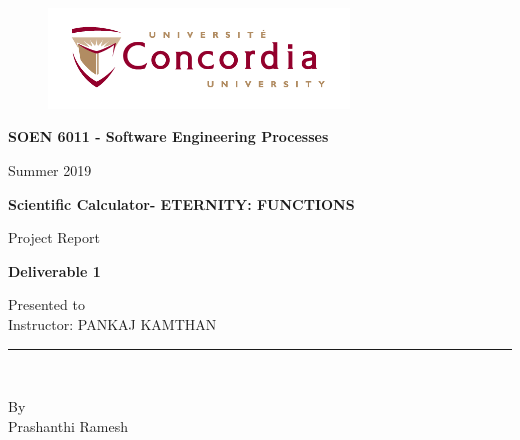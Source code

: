 \documentclass[11pt, english]{report}
\begin{document}
\begin{titlepage}

\begin{center}
\vspace*{-1in}
\begin{figure}[htb]
\begin{center}
\includegraphics[width=8cm]{logo}
\end{center}
\end{figure}
\begin{Large}
\textbf{SOEN 6011 - Software Engineering Processes} \\
\end{Large}
\vspace*{0.1in}
Summer 2019\\
\vspace*{0.5in}
\begin{Large}
\textbf{Scientific Calculator-  ETERNITY: FUNCTIONS} \\
\end{Large}
\vspace*{0.4in}
\begin{large}
Project Report\\
\end{large}
\vspace*{0.2in}
\begin{Large}
\textbf{Deliverable 1} \\
\end{Large}
\vspace*{0.3in}
\begin{large}
Presented to \\
\vspace*{0.1in}
Instructor: PANKAJ KAMTHAN 
 \\
\end{large}
\vspace*{0.3in}
\rule{80mm}{0.1mm}\\
\vspace*{0.1in}
\begin{large}
By \\
Prashanthi Ramesh\\ 
\vspace*{0.3in}
\date{\normalsize\today} 

\end{large}
\end{center}
\end{titlepage}
\end{document}
